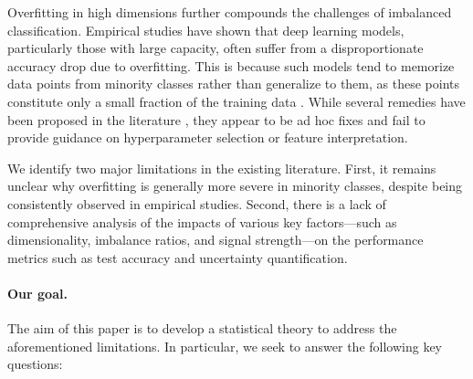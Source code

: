 Overfitting in high dimensions further compounds the challenges of imbalanced classification. Empirical studies have shown that deep learning models, particularly those with large capacity, often suffer from a disproportionate accuracy drop due to overfitting. This is because such models tend to memorize data points from minority classes rather than generalize to them, as these points constitute only a small fraction of the training data \cite{sagawa2020investigation}. While several remedies have been proposed in the literature \cite{huang2016learning, khan2019striking, liu2019large, cao2019learning}, they appear to be ad hoc fixes and fail to provide guidance on hyperparameter selection or feature interpretation.

We identify two major limitations in the existing literature. First, it remains unclear why overfitting is generally more severe in minority classes, despite being consistently observed in empirical studies. Second, there is a lack of comprehensive analysis of the impacts of various key factors---such as dimensionality, imbalance ratios, and signal strength---on the performance metrics such as test accuracy and uncertainty quantification.


\paragraph{Our goal.} The aim of this paper is to develop a statistical theory to address the aforementioned limitations. In particular, we seek to answer the following key questions:

